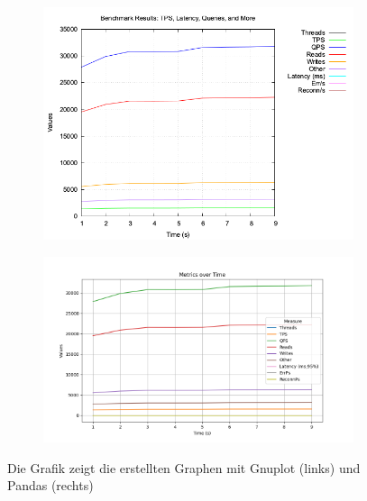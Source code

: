 

\begin{figure}[!ht]
    \centering
    \begin{subfigure}[t]{0.48\textwidth}
        \centering
        \includegraphics[width=\textwidth]{PNGs/Demo/sysbench_output}
        \label{demo-gnuplot}
    \end{subfigure}
    \hfill
    \begin{subfigure}[t]{0.48\textwidth}
        \centering
        \includegraphics[width=\textwidth]{PNGs/Demo/Summary}
        \label{demo-pandas}
    \end{subfigure}
    \caption[Demo-Graphs: Gnuplot vs. Pandas]{Die Grafik zeigt die erstellten Graphen mit Gnuplot (links) und Pandas (rechts)}
    \label{fig:demo-graph-generation}
\end{figure}


